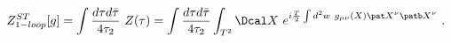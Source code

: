 \begin{equation}
  Z^{ST}_{1-loop}[g] = \int \frac{d\tau d\bar{\tau}}{4\tau_2}~Z(\tau)
  = \int \frac{d\tau d\bar{\tau}}{4\tau_2} \int_{T^2}
  \Dcal X~e^{i\frac{T}{2}\int d^2w~g_{\mu\nu}(X)\pat X^\nu \patb
  X^\nu} \ .
\end{equation}

